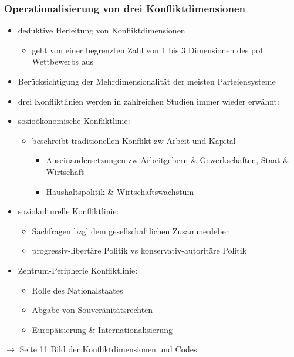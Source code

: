\documentclass[11pt]{article}
\begin{document}
\subsubsection{Operationalisierung von drei Konfliktdimensionen}
\label{sec:org6206f82}
\begin{itemize}
\item deduktive Herleitung von Konfliktdimensionen
\begin{itemize}
\item geht von einer begrenzten Zahl von 1 bis 3 Dimensionen des pol Wettbewerbs aus
\end{itemize}
\item Berücksichtigung der Mehrdimensionalität der meisten Parteiensysteme
\item drei Konfliktlinien werden in zahlreichen Studien immer wieder erwähnt:
\item sozioökonomische Konfliktlinie:
\begin{itemize}
\item beschreibt traditionellen Konflikt zw Arbeit und Kapital
\begin{itemize}
\item Auseinandersetzungen zw Arbeitgebern \& Gewerkschaften, Staat \& Wirtschaft
\item Haushaltspolitik \& Wirtschaftswachstum
\end{itemize}
\end{itemize}
\item soziokulturelle Konfliktlinie:
\begin{itemize}
\item Sachfragen bzgl dem gesellschaftlichen Zusammenleben
\item progressiv-libertäre Politik vs konservativ-autoritäre Politik
\end{itemize}
\item Zentrum-Peripherie Konfliktlinie:
\begin{itemize}
\item Rolle des Nationalstaates
\item Abgabe von Souveränitätsrechten
\item Europäisierung \& Internationalisierung
\end{itemize}
\end{itemize}

\(\rightarrow\) Seite 11 Bild der Konfliktdimensionen und Codes
\end{document}
